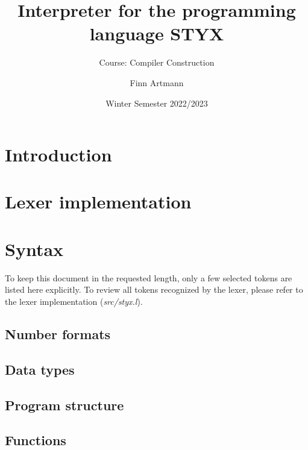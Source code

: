 \documentclass[12pt,a4paper]{scrartcl}
\begin{document}
    \begin{titlepage}
        \titlehead{OTH Regensburg\\
        Computer Science and Mathematics\\}
        \subject{Study Project}
        \subtitle{Course: Compiler Construction}
        \title{Interpreter for the programming language STYX}
        \date{Winter Semester 2022/2023}
        \author{Finn Artmann}
        \maketitle
    \end{titlepage}


    \tableofcontents

    \newpage

    \section{Introduction}
        

    \section{Lexer implementation}
        

    \section{Syntax}
        To keep this document in the requested length, only a few selected tokens are listed here explicitly.
        To review all tokens recognized by the lexer, please refer to the lexer implementation (\textit{src/styx.l}).
        \subsection{Number formats}
            
        \subsection{Data types}    
            
        \subsection{Program structure}
            
        \subsection{Functions}
            
\end{document}
